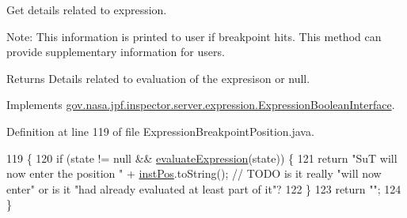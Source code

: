 Get details related to expression. 

Note\+: This information is printed to user if breakpoint hits. This method can provide supplementary information for users.

\begin{DoxyReturn}{Returns}
Details related to evaluation of the expresison or null. 
\end{DoxyReturn}


Implements \hyperlink{interfacegov_1_1nasa_1_1jpf_1_1inspector_1_1server_1_1expression_1_1_expression_boolean_interface_a6e5af96b023d71fcda296c10f5d7c555}{gov.\+nasa.\+jpf.\+inspector.\+server.\+expression.\+Expression\+Boolean\+Interface}.



Definition at line 119 of file Expression\+Breakpoint\+Position.\+java.


\begin{DoxyCode}
119                                                   \{
120     \textcolor{keywordflow}{if} (state != null && \hyperlink{classgov_1_1nasa_1_1jpf_1_1inspector_1_1server_1_1expression_1_1expressions_1_1_expression_breakpoint_position_a79a13d6555f1168da4468a1fada1e04c}{evaluateExpression}(state)) \{
121       \textcolor{keywordflow}{return} \textcolor{stringliteral}{"SuT will now enter the position "} + \hyperlink{classgov_1_1nasa_1_1jpf_1_1inspector_1_1server_1_1expression_1_1expressions_1_1_expression_breakpoint_position_a8f9bc711f79a45ff712cbfb1253e677b}{instPos}.toString(); \textcolor{comment}{// TODO is it really "will now
       enter" or is it "had already evaluated at least part of it"?}
122     \}
123     \textcolor{keywordflow}{return} \textcolor{stringliteral}{""};
124   \}
\end{DoxyCode}
